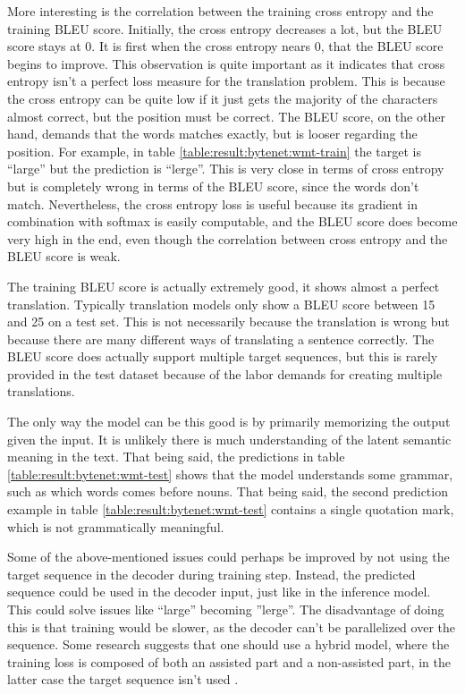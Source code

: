 More interesting is the correlation between the training cross entropy and the training BLEU score. Initially, the cross entropy decreases a lot, but the BLEU score stays at 0. It is first when the cross entropy nears 0, that the BLEU score begins to improve. This observation is quite important as it indicates that cross entropy isn't a perfect loss measure for the translation problem. This is because the cross entropy can be quite low if it just gets the majority of the characters almost correct, but the position must be correct. The BLEU score, on the other hand, demands that the words matches exactly, but is looser regarding the position. For example, in table \ref{table:result:bytenet:wmt-train} the target is ``large'' but the prediction is ``lerge''. This is very close in terms of cross entropy but is completely wrong in terms of the BLEU score, since the words don't match. Nevertheless, the cross entropy loss is useful because its gradient in combination with softmax is easily computable, and the BLEU score does become very high in the end, even though the correlation between cross entropy and the BLEU score is weak.

The training BLEU score is actually extremely good, it shows almost a perfect translation. Typically translation models only show a BLEU score between 15 and 25 on a test set. This is not necessarily because the translation is wrong but because there are many different ways of translating a sentence correctly. The BLEU score does actually support multiple target sequences, but this is rarely provided in the test dataset because of the labor demands for creating multiple translations.

The only way the model can be this good is by primarily memorizing the output given the input. It is unlikely there is much understanding of the latent semantic meaning in the text. That being said, the predictions in table \ref{table:result:bytenet:wmt-test} shows that the model understands some grammar, such as which words comes before nouns. That being said, the second prediction example in table \ref{table:result:bytenet:wmt-test} contains a single quotation mark, which is not grammatically meaningful. 

Some of the above-mentioned issues could perhaps be improved by not using the target sequence in the decoder during training step. Instead, the predicted sequence could be used in the decoder input, just like in the inference model. This could solve issues like ``large'' becoming ''lerge''. The disadvantage of doing this is that training would be slower, as the decoder can't be parallelized over the sequence. Some research suggests that one should use a hybrid model, where the training loss is composed of both an assisted part and a non-assisted part, in the latter case the target sequence isn't used \cite{no-assist-train}.

